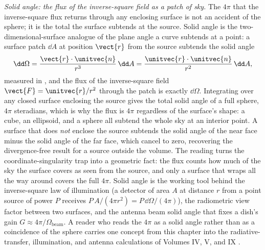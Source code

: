 \begin{mastery}
\textit{Solid angle: the flux of the inverse-square field as a patch of
sky.} The $4\pi$ that the inverse-square flux returns through any
enclosing surface is not an accident of the sphere; it is the total
 the surface subtends at the source. Solid angle is
the two-dimensional-surface analogue of the plane angle a curve subtends
at a point: a surface patch $\dd A$ at position $\vect{r}$ from the
source subtends the solid angle
\[
\dd\Omega = \frac{\vect{r}\cdot\unitvec{n}}{r^{3}}\,\dd A =
\frac{\unitvec{r}\cdot\unitvec{n}}{r^{2}}\,\dd A,
\]
measured in , and the flux of the inverse-square
field $\vect{F} = \unitvec{r}/r^{2}$ through the patch is exactly
$\dd\Omega$. Integrating over any closed surface enclosing the source
gives the total solid angle of a full sphere, $4\pi$ steradians, which
is why the flux is $4\pi$ regardless of the surface's shape: a cube, an
ellipsoid, and a sphere all subtend the whole sky at an interior point.
A surface that does \emph{not} enclose the source subtends the solid
angle of the near face minus the solid angle of the far face, which
cancel to zero, recovering the divergence-free result for a source
outside the volume. The reading turns the coordinate-singularity trap
into a geometric fact: the flux counts how much of the sky the surface
covers as seen from the source, and only a surface that wraps all the
way around covers the full $4\pi$. Solid angle is the working tool
behind the inverse-square law of illumination (a detector of area $A$ at
distance $r$ from a point source of power $P$ receives $P\,A/(4\pi r^{2})
= P\,\dd\Omega/(4\pi)$), the radiometric view factor between two
surfaces, and the antenna beam solid angle that fixes a dish's gain
$G \approx 4\pi/\Omega_{\text{beam}}$. A reader who reads the $4\pi$ as
a solid angle rather than as a coincidence of the sphere carries one
concept from this chapter into the radiative-transfer, illumination, and
antenna calculations of Volumes IV, V, and IX
\cite{text:incropera2007}.
\end{mastery}

